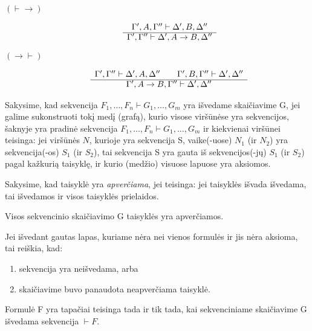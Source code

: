 \begin{defn}
\begin{description}
\[\begin{array}{c}
      \end{array}
      \]
    \item[$(\vdash \to)$] 
      \[
      \begin{array}{c}
        \Gamma',A,\Gamma'' \vdash \Delta',B,\Delta'' \\
        \cline{1-1}
        \Gamma',\Gamma'' \vdash \Delta',A \to B,\Delta''
      \end{array}
      \]
    \item[$(\to \vdash)$] 
      \[
      \begin{array}{c}
        \Gamma',\Gamma'' \vdash \Delta',A,\Delta'' \qquad %
        \Gamma',B,\Gamma'' \vdash \Delta',\Delta'' \\
        \cline{1-1}
        \Gamma',A \to B,\Gamma'' \vdash \Delta',\Delta''
      \end{array}
      \]
  \end{description}
\end{defn}

Sakysime, kad sekvencija $F_{1},\dots,F_{n} \vdash G_{1},\dots,G_{m}$ yra
išvedame skaičiavime G, jei galime sukonstruoti tokį medį (grafą),
kurio visose viršūnėse yra sekvencijos, šaknyje yra pradinė sekvencija
$F_{1},\dots,F_{n} \vdash G_{1},\dots,G_{m}$ ir kiekvienai viršūnei 
teisinga: jei viršūnės $N$, kurioje 
yra sekvencija S, vaike(-uose) $N_{1}$ (ir $N_{2}$) yra sekvencija(-os)
$S_{1}$ (ir $S_{2}$), tai sekvencija S yra gauta iš sekvencijos(-jų)
$S_{1}$ (ir $S_{2}$) pagal kažkurią taisyklę, ir kurio (medžio)
visuose lapuose yra aksiomos.

Sakysime, kad taisyklė yra \emph{apverčiama}, jei teisinga: jei taisyklės
išvada išvedama, tai išvedamos ir visos taisyklės prielaidos.

Visos sekvencinio skaičiavimo G taisyklės yra apverčiamos.

Jei išvedant gautas lapas, kuriame nėra nei vienos formulės ir jis nėra
aksioma, tai reiškia, kad:
\begin{enumerate}
  \item sekvencija yra neišvedama, arba
  \item skaičiavime buvo panaudota neapverčiama taisyklė.
\end{enumerate}

\begin{prop}
  Formulė F yra tapačiai teisinga tada ir tik tada, kai sekvenciniame
  skaičiavime G išvedama sekvencija $\vdash F$.
\end{prop}
